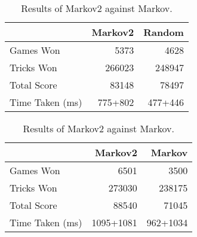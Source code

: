 \begin{table}[ht]
    \begin{minipage}{.5\linewidth}
        \centering
        \begin{tabular}{l|rr}
            ~               &   Markov2 &   Random  \\  \hline
            Games Won       &   5373        &   4628   \\
            Tricks Won      &   266023      &   248947 \\
            Total Score     &   83148       &   78497  \\
            Time Taken (ms) &   775+802   &   477+446
        \end{tabular}
        \caption{Results of Markov2 against Random.}
        \label{tab:markov2_random}
    \end{minipage}%
    \begin{minipage}{.5\linewidth}
        \centering
        \begin{tabular}{l|rr}
            ~               &   Markov2 &   Markov  \\  \hline
            Games Won       &   6501        &   3500   \\
            Tricks Won      &   273030      &   238175 \\
            Total Score     &   88540       &   71045  \\
            Time Taken (ms) &   1095+1081   &   962+1034
        \end{tabular}
        \caption{Results of Markov2 against Markov.}
        \label{tab:markov2_markov}
    \end{minipage} 
\end{table}

